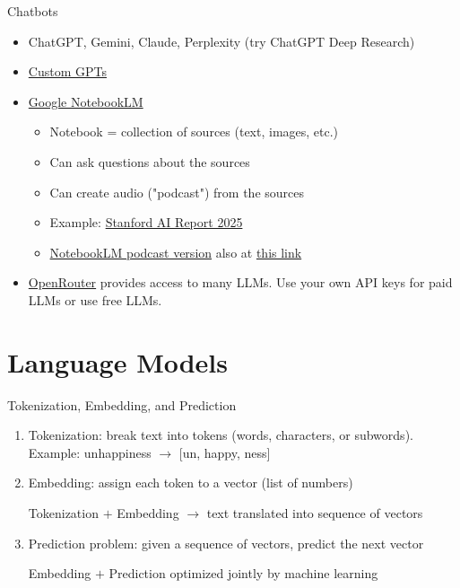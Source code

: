 \documentclass[10pt]{beamer}
\begin{document}
\begin{frame}{Chatbots}
    \begin{itemize}
     \item ChatGPT, Gemini, Claude, Perplexity (try ChatGPT Deep Research)
     \item \href{https://openai.com/index/introducing-gpts/}{Custom GPTs}
    \item \href{https://notebooklm.google/}{Google NotebookLM}
    \begin{itemize}
        \item Notebook = collection of sources (text, images, etc.)
        \item Can ask questions about the sources
        \item Can create audio ("podcast") from the sources
    \item Example: \href{https://hai.stanford.edu/ai-index/2025-ai-index-report}{Stanford AI Report 2025}
    \item \href{https://notebooklm.google.com/notebook/83e22c17-71bf-4bb2-a803-294ffe11d365/audio}{NotebookLM podcast version} also at \href{https://www.dropbox.com/scl/fi/ui3b7et1mi575b947n11s/Stanford_AI_Report_2025.wav?rlkey=dpfb7i75uk1yhecn668bzwp2w&dl=1}{this link}
    \end{itemize}
    \item \href{https://openrouter.ai/}{OpenRouter} provides access to many LLMs.  Use your own API keys for paid LLMs or use free LLMs.
        \end{itemize}
    \end{frame}

\section{Language Models}

\begin{frame}{Tokenization, Embedding, and Prediction}
    \begin{enumerate}
        \item Tokenization: break text into tokens (words, characters, or subwords). Example: unhappiness $\rightarrow$ [un, happy, ness]
        \item Embedding: assign each token to a vector (list of numbers)
        \vspace{1em}
    \begin{center}
       \alert{Tokenization $+$ Embedding $\rightarrow$ text translated into sequence of vectors}
        \end{center}   \vspace{1em}
        \item Prediction problem:
        given a sequence of vectors, predict the next vector
        \vspace{1em}
        \begin{center} \alert{Embedding $+$ Prediction optimized jointly by machine learning} \end{center}
    \end{enumerate}
\end{frame}
\end{document}
